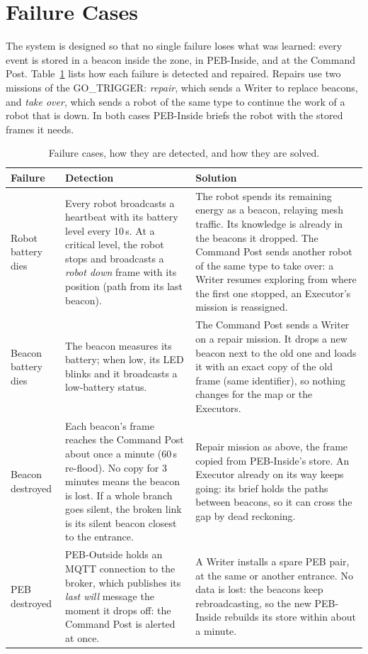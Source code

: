 \section{Failure Cases}\label{sec:failure-cases}

The system is designed so that no single failure loses what was learned:
every event is stored in a beacon inside the zone, in PEB-Inside, and at the
Command Post. Table~\ref{tab:failures} lists how each failure is detected and
repaired. Repairs use two missions of the GO\_TRIGGER: \emph{repair}, which
sends a Writer to replace beacons, and \emph{take over}, which sends a robot
of the same type to continue the work of a robot that is down. In both cases
PEB-Inside briefs the robot with the stored frames it needs.

\begin{table}[h]
\centering
\small
\begin{tabularx}{\textwidth}{@{}p{2.2cm} X X@{}}
\toprule
Failure & Detection & Solution \\
\midrule
Robot battery dies
  & Every robot broadcasts a heartbeat with its battery level every 10\,s.
    At a critical level, the robot stops and broadcasts a \emph{robot down}
    frame with its position (path from its last beacon).
  & The robot spends its remaining energy as a beacon, relaying mesh
    traffic. Its knowledge is already in the beacons it dropped. The Command
    Post sends another robot of the same type to take over: a Writer resumes
    exploring from where the first one stopped, an Executor's mission is
    reassigned. \\
\addlinespace
Beacon battery dies
  & The beacon measures its battery; when low, its LED blinks and it
    broadcasts a low-battery status.
  & The Command Post sends a Writer on a repair mission. It drops a new
    beacon next to the old one and loads it with an exact copy of the old
    frame (same identifier), so nothing changes for the map or the
    Executors. \\
\addlinespace
Beacon destroyed
  & Each beacon's frame reaches the Command Post about once a minute (60\,s
    re-flood). No copy for 3 minutes means the beacon is lost. If a whole
    branch goes silent, the broken link is its silent beacon closest to the
    entrance.
  & Repair mission as above, the frame copied from PEB-Inside's store. An
    Executor already on its way keeps going: its brief holds the paths
    between beacons, so it can cross the gap by dead reckoning. \\
\addlinespace
PEB destroyed
  & PEB-Outside holds an MQTT connection to the broker, which publishes its
    \emph{last will} message the moment it drops off: the Command Post is
    alerted at once.
  & A Writer installs a spare PEB pair, at the same or another entrance.
    No data is lost: the beacons keep rebroadcasting, so the new PEB-Inside
    rebuilds its store within about a minute. \\
\bottomrule
\end{tabularx}
\caption{Failure cases, how they are detected, and how they are solved.}
\label{tab:failures}
\end{table}
